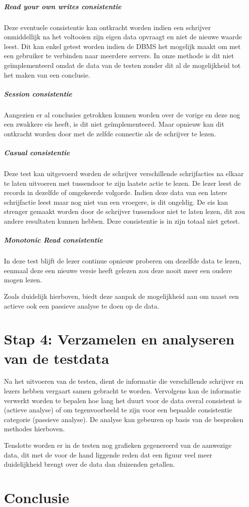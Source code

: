 \subparagraph{Read your own writes consistentie} Deze eventuele consistentie kan ontkracht worden indien een schrijver onmiddellijk na het voltooien zijn eigen data opvraagt en niet de nieuwe waarde leest. Dit kan enkel getest worden indien de DBMS het mogelijk maakt om met een gebruiker te verbinden naar meerdere servers.  In onze methode is dit niet geïmplementeerd omdat de data van de testen zonder dit al de mogelijkheid tot het maken van een conclusie.  

\subparagraph{Session consistentie} Aangezien er al conclusies getrokken kunnen worden over de vorige en deze nog een zwakkere eis heeft, is dit niet geïmplementeerd. Maar opnieuw kan dit ontkracht worden door met de zelfde connectie als de schrijver te lezen. 

\subparagraph{Casual consistentie} Deze test kan uitgevoerd worden de schrijver verschillende schrijfacties na elkaar te laten uitvoeren met tussendoor te zijn laatste actie te lezen. De lezer leest de records in dezelfde of omgekeerde volgorde. Indien deze data van een latere schrijfactie leest maar nog niet van een vroegere, is dit ongeldig. De eis kan strenger gemaakt worden door de schrijver tussendoor niet te laten lezen, dit zou andere resultaten kunnen hebben. Deze consistentie is in zijn totaal niet getest. 

\subparagraph{Monotonic Read consistentie} In deze test blijft de lezer continue opnieuw proberen om dezelfde data te lezen, eenmaal deze een nieuwe versie heeft gelezen zou deze nooit meer een oudere mogen lezen. 

Zoals duidelijk hierboven, biedt deze aanpak de mogelijkheid aan om naast een actieve ook een passieve analyse te doen op de data. 

\section{Stap 4: Verzamelen en analyseren van de testdata}
Na het uitvoeren van de testen, dient de informatie die verschillende schrijver en lezers hebben vergaart samen gebracht te worden. Vervolgens kan de informatie verwerkt worden te bepalen hoe lang het duurt voor de data overal consistent is (actieve analyse) of om  tegenvoorbeeld te zijn voor een bepaalde consistentie categorie (passieve analyse). De analyse kan gebeuren op basis van de besproken methodes hierboven. 

Tenslotte worden er in de testen nog grafieken gegenereerd van de aanwezige data, dit met de voor de hand liggende reden dat een figuur veel meer duidelijkheid brengt over de data dan duizenden getallen.  

\section{Conclusie}
